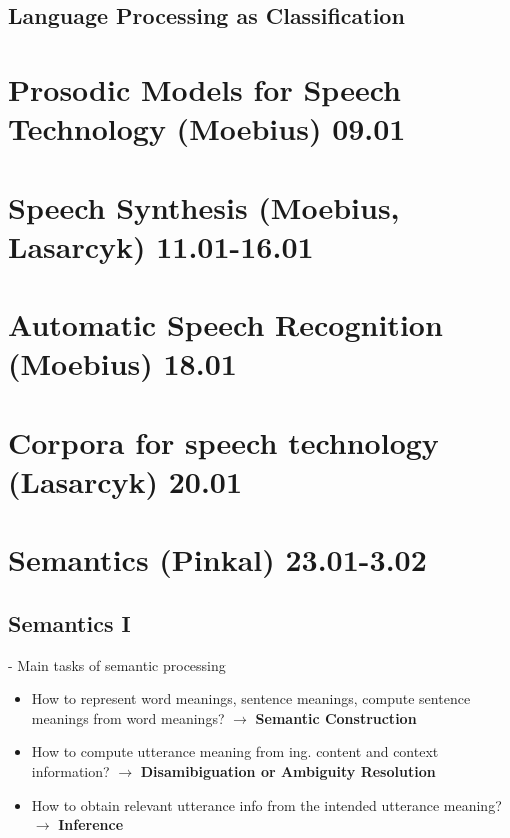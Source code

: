 \documentclass[11pt]{article}
\newenvironment{itemise}{
\begin{itemize}
  \setlength{\itemsep}{1pt}
  \setlength{\parskip}{0pt}
  \setlength{\parsep}{0pt}
}{\end{itemize}}
\begin{document}
\subsection{Language Processing as Classification}


\newpage\section{Prosodic Models for Speech Technology (Moebius) 09.01}

\newpage\section{Speech Synthesis (Moebius, Lasarcyk) 11.01-16.01}

\newpage\section{Automatic Speech Recognition (Moebius) 18.01}

\newpage\section{Corpora for speech technology (Lasarcyk) 20.01}

\newpage\section{Semantics (Pinkal) 23.01-3.02}

\subsection{ Semantics I }
- Main tasks of semantic processing
\begin{itemise}
 \item How to represent word meanings, sentence meanings, compute sentence meanings from word meanings? $\rightarrow$ {\bf Semantic Construction}
 \item How to compute utterance meaning from ing. content and context information? $\rightarrow$ {\bf Disamibiguation or Ambiguity Resolution}
 \item How to obtain relevant utterance info from the intended utterance meaning? $\rightarrow$ {\bf Inference}
\end{itemise}
\end{document}
